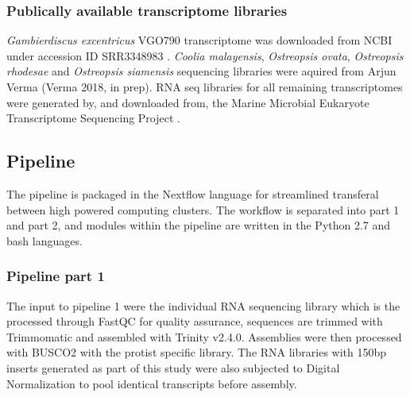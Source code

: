 \documentclass[12pt]{article}
\begin{document}
\subsubsection*{Publically available transcriptome libraries}
\emph{Gambierdiscus excentricus} VGO790 transcriptome was downloaded from NCBI under accession ID SRR3348983 \cite{kohli2017role}. 
\textit{Coolia malayensis}, \textit{Ostreopsis ovata}, \textit{Ostreopsis rhodesae} and \textit{Ostreopsis siamensis} sequencing libraries were aquired from Arjun Verma (Verma 2018, in prep). 
RNA seq libraries for all remaining transcriptomes were generated by, and downloaded from, the Marine Microbial Eukaryote Transcriptome Sequencing Project \citep{keeling2014marine}.

\subsection*{Pipeline}
The pipeline is packaged in the Nextflow language for streamlined transferal between high powered computing clusters. 
The workflow is separated into part 1 and part 2, and modules within the pipeline are written in the Python 2.7 and bash languages.
\subsubsection*{Pipeline part 1}
The input to pipeline 1 were the individual RNA sequencing library which is the processed through FastQC for quality assurance, sequences are trimmed with Trimmomatic and assembled with Trinity v2.4.0. 
Assemblies were then processed with BUSCO2 with the protist specific library.
The RNA libraries with 150bp inserts generated as part of this study were also subjected to Digital Normalization to pool identical transcripts before assembly.                                                                                                                                                                                                                                                                                                                                                                                                                                                                                                                                                                                                                                                                                                                                                                                                                                                                                                                                                                                                                                                                                                                                                                                                                                                                                                                                           
\end{document}
